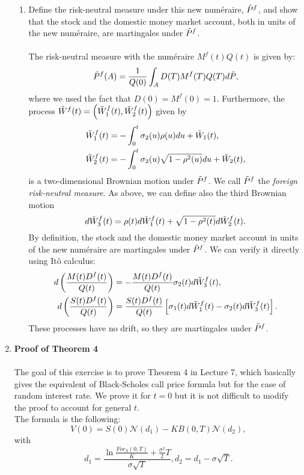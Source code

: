 \documentclass[11pt,a4,table]{article}
\begin{document}
\begin{enumerate}
\begin{enumerate}
        \item Define the risk-neutral measure under this new numéraire, $\Tilde{P}^f$, and show that the stock and the domestic money market account, both in units of the new numéraire, are martingales under $\Tilde{P}^f$.\\\\
        The risk-neutral measure with the numéraire $M^f(t)Q(t)$ is given by:
        \begin{equation}
            \Tilde{P}^f(A)=\frac{1}{Q(0)}\int_A D(T)M^f(T)Q(T) d\Tilde{P},
        \end{equation}
        where we used the fact that $D(0)=M^f(0)=1$. Furthermore, the process $\Tilde{W}^f(t) = \left(\Tilde{W}_1^f(t),\Tilde{W}_2^f(t)\right)$ given by
        \begin{align*}
            \Tilde{W}_1^f(t) &= -\int_0^t \sigma_2(u)\rho(u) du + \Tilde{W}_1(t),\\
            \Tilde{W}_2^f(t) &= -\int_0^t \sigma_2(u)\sqrt{1-\rho^2(u)} du + \Tilde{W}_2(t),
        \end{align*}
        is a two-dimensional Brownian motion under $\Tilde{P}^f$. We call $\Tilde{P}^f$ the \textit{foreign risk-neutral measure}. As above, we can define also the third Brownian motion
        \begin{equation*}
            d\Tilde{W}_3^f(t) = \rho(t) d\Tilde{W}_1^f(t) + \sqrt{1-\rho^2(t)} d\Tilde{W}_2^f(t).
        \end{equation*}
        By definition, the stock and the domestic money market account in units of the new numéraire are martingales under $\Tilde{P}^f$. We can verify it directly using Itô calculus:
        \begin{align*}
            d\left(\frac{M(t)D^f(t)}{Q(t)}\right) &= -\frac{M(t)D^f(t)}{Q(t)}\sigma_2(t) d\Tilde{W}_3^f(t), \\
            d\left(\frac{S(t)D^f(t)}{Q(t)}\right) &= \frac{S(t)D^f(t)}{Q(t)} \left[\sigma_1(t) d\Tilde{W}_1^f(t) - \sigma_2(t) d\Tilde{W}_3^f(t)\right].
        \end{align*}
        These processes have no drift, so they are martingales under $\Tilde{P}^f$.
    \end{enumerate}
    
    
    \item \textbf{Proof of Theorem 4}\\
    \\
    The goal of this exercise is to prove Theorem 4 in Lecture 7, which basically gives the equivalent of Black-Scholes call price formula but for the case of random interest rate. We prove it for $t=0$ but it is not difficult to modify the proof to account for general $t$.\\
    The formula is the following:
    \begin{equation}
        V(0) = S(0)\mathcal{N}(d_1) - K B (0,T) \mathcal{N}(d_2),
    \end{equation}
    with
    \begin{equation*}
        d_1=\frac{\ln \frac{For_S(0,T)}{K}+\frac{\sigma^2}{2}T}{\sigma\sqrt{T}}, d_2 = d_1 - \sigma\sqrt{T}.
    \end{equation*}
    

\end{enumerate}
\end{document}

